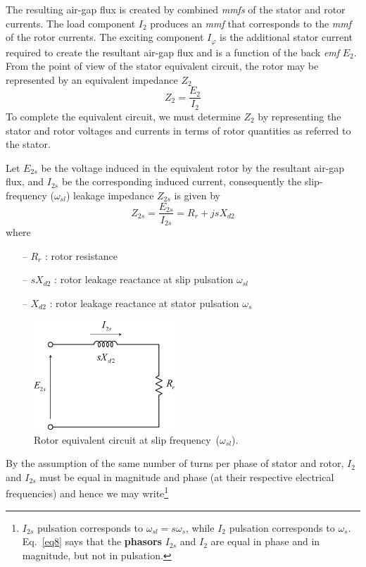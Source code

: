 \documentclass[11pt,a4paper,oneside]{book}
\numberwithin{equation}{section}
\theoremstyle{it}
\theoremstyle{definition}
\begin{document}
The resulting air-gap flux is created by combined \textit{mmfs} of the stator and rotor currents. The load component $I_2$ produces an \textit{mmf} that corresponds to the \textit{mmf} of the rotor currents. The exciting component $I_{\varphi}$ is the additional stator current required to create the resultant air-gap flux and is a function of the back \textit{emf} $E_2$.
From the point of view of the stator equivalent circuit, the rotor may be represented by an equivalent impedance $Z_2$
\begin{equation} \label{eq6}
	Z_2 = \frac{E_2}{I_2}
\end{equation}
To complete the equivalent circuit, we must determine $Z_2$ by representing the stator and rotor voltages and currents in terms of rotor quantities as referred to the stator.

Let $E_{2s}$ be the voltage induced in the equivalent rotor by the resultant air-gap flux, and $I_{2s}$ be the corresponding induced current, consequently the slip-frequency ($\omega_{sl}$) leakage impedance $Z_{2s}$ is given by
\begin{equation} \label{eq7}
	Z_{2s} = \frac{E_{2s}}{I_{2s}} = R_r+jsX_{d2}
\end{equation}
where
\begin{itemize}
	\item[--] $R_r$ : rotor resistance	
	\item[--] $sX_{d2}$ : rotor leakage reactance at slip pulsation $\omega_{sl}$
	\item[--] $X_{d2}$ : rotor leakage reactance at stator pulsation $\omega_s$
\end{itemize}	
\begin{figure}[H]
	\centering
	\includegraphics[width = 150pt, keepaspectratio]{figures/rotor_equivalent_circuit.eps}
	\captionsetup{width=0.5\textwidth, font=small}		
	\caption{Rotor equivalent circuit at slip frequency~($\omega_{sl}$).}
	\label{rotor_equivalent_circuit} 
\end{figure}
By the assumption of the same number of turns per phase of stator and rotor, $I_2$ and $I_{2s}$ must be equal in magnitude and phase (at their respective electrical frequencies) and hence we may write\footnote{$I_{2s}$ pulsation corresponds to $\omega_{sl}=s\omega_{s}$, while $I_{2}$ pulsation corresponds to $\omega_{s}$. Eq.~\eqref{eq8} says that the \textbf{phasors} $I_{2s}$ and $I_{2}$ are equal in phase and in magnitude, but not in pulsation.}
\end{document}
